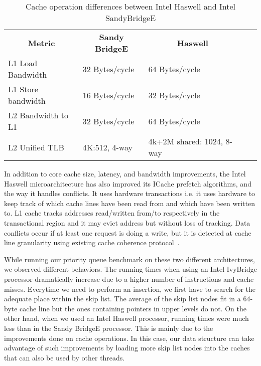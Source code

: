 \begin{table}[ht]
\footnotesize
\begin{tabular}{|l|l|l|ll}
\cline{1-3}
\multicolumn{1}{|c|}{\textbf{Metric}} & \multicolumn{1}{c|}{\textbf{Sandy BridgeE}} & \multicolumn{1}{c|}{\textbf{Haswell}} &  &  \\ \cline{1-3}
L1 Load Bandwidth                     & 32 Bytes/cycle                           & 64 Bytes/cycle                        &  &  \\ \cline{1-3}
L1 Store bandwidth                    & 16 Bytes/cycle                           & 32 Bytes/cycle                        &  &  \\ \cline{1-3}
L2 Bandwidth to L1                    & 32 Bytes/cycle                           & 64 Bytes/cycle                        &  &  \\ \cline{1-3}
L2 Unified TLB                        & 4K:512, 4-way                            & 4k+2M shared: 1024, 8-way             &  &  \\ \cline{1-3}
\end{tabular}
\caption{Cache operation differences between Intel Haswell and Intel SandyBridgeE}
\label{tab:haswell_ivy}
\end{table}

In addition to core cache size, latency, and bandwidth improvements, the Intel Haswell microarchitecture has also improved its ICache prefetch algorithms, and the way it handles conflicts. It uses hardware transactions i.e. it uses hardware to keep track of which cache lines have been read from and which have been written to. L1 cache tracks addresses read/written from/to respectively in the transactional region and it may evict address but without loss of tracking. Data conflicts occur if at least one request is doing a write, but it is detected at cache line granularity using existing cache coherence protocol~\cite{rajwar_qconsf2012,dk_haswell}.

While running our priority queue benchmark on these two different architectures, we observed different behaviors. The running times when using an Intel IvyBridge processor dramatically increase due to a higher number of instructions and cache misses. Everytime we need to perform an insertion, we first have to search for the adequate place within the skip list. The average of the skip list nodes fit in a 64-byte cache line but the ones containing pointers in upper levels do not. On the other hand, when we used an Intel Haswell processor, running times were much less than in the Sandy BridgeE processor. This is mainly due to the improvements done on cache operations. In this case, our data structure can take advantage of such improvements by loading more skip list nodes into the caches that can also be used by other threads.


